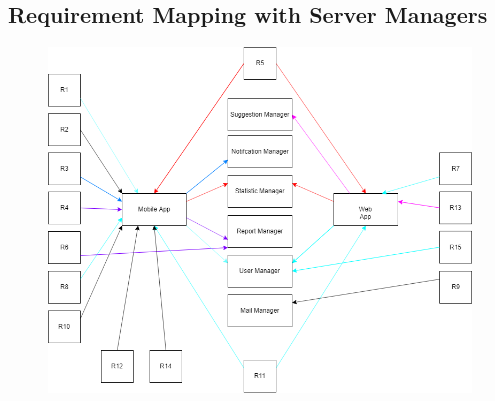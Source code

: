 \subsection{Requirement Mapping with Server Managers}

\begin{figure}[H]
\centering
\includegraphics[width=\textwidth]{Images/ReqMapping.png}
\end{figure}
